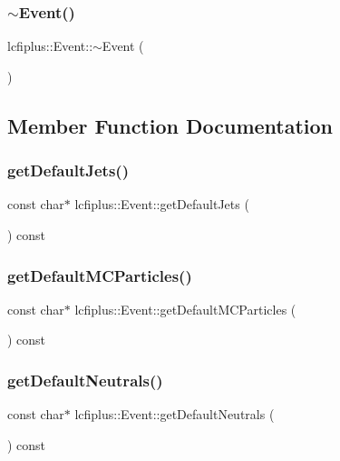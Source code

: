 \subsubsection{$\sim$\+Event()}
{\footnotesize\ttfamily lcfiplus\+::\+Event\+::$\sim$\+Event (\begin{DoxyParamCaption}{ }\end{DoxyParamCaption})}



\subsection{Member Function Documentation}
\mbox{\label{classlcfiplus_1_1Event_a0cbf574c8a8313d99d1962b668a6ff3b}} 
\subsubsection{get\+Default\+Jets()}
{\footnotesize\ttfamily const char$\ast$ lcfiplus\+::\+Event\+::get\+Default\+Jets (\begin{DoxyParamCaption}{ }\end{DoxyParamCaption}) const\hspace{0.3cm}{\ttfamily [inline]}}

\mbox{\label{classlcfiplus_1_1Event_ac3417913e8c9ccd145a99a333f0b25ba}} 
\subsubsection{get\+Default\+M\+C\+Particles()}
{\footnotesize\ttfamily const char$\ast$ lcfiplus\+::\+Event\+::get\+Default\+M\+C\+Particles (\begin{DoxyParamCaption}{ }\end{DoxyParamCaption}) const\hspace{0.3cm}{\ttfamily [inline]}}

\mbox{\label{classlcfiplus_1_1Event_a05b4f6ccc75654c997d9ccc15384365d}} 
\subsubsection{get\+Default\+Neutrals()}
{\footnotesize\ttfamily const char$\ast$ lcfiplus\+::\+Event\+::get\+Default\+Neutrals (\begin{DoxyParamCaption}{ }\end{DoxyParamCaption}) const\hspace{0.3cm}{\ttfamily [inline]}}

